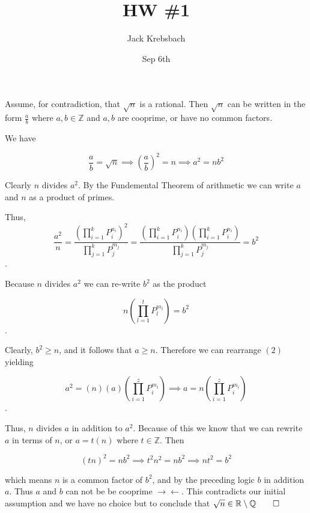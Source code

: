 \documentclass{report}
\title{HW \#1}
\author{Jack Krebsbach }
\date{Sep 6th}
\begin{document}
\maketitle

\sol Assume, for contradiction, that $\sqrt{n}$ is a rational. Then $\sqrt{n}$ can be written in the form $\frac{a}{b}$ where $a,b \in \mathbb{Z}$ and $a,b$ are cooprime, or have no common factors. 

We have 


\begin{equation}
  \frac{a}{b} = \sqrt{n} \implies
  \left(\frac{a}{b}\right)^{2} = n \implies a^2 = n b^2
\end{equation}


Clearly $n$ divides $a^{2}$. 
By the Fundemental Theorem of arithmetic we can write $a$ and $n$ as a product of primes.

Thus, 
\begin{equation}
  \frac{a^2}{n} = \frac{\left(\prod^{k}_{i = 1} P_{i}^{n_i}\right)^2}{\prod_{j = 1}^{k} P_{j}^{m_j}} =\frac{
\left(\prod^{k}_{i = 1} P_{i}^{n_i}\right)
\left(\prod^{k}_{i = 1} P_{i}^{n_i}\right)
  }{\prod_{j = 1}^{k} P_{j}^{m_j}}  = b^2
\end{equation}.


Because $n$ divides $a^2$ we can re-write $b^2$ as the product


\begin{equation}
  n \left(\prod^{t}_{l = 1} P_{l}^{m_l}\right) = b^2
\end{equation}.


Clearly, $b^2 \geq n$, and it follows that $a \geq n$. Therefore we can rearrange $(2)$ yielding

\begin{equation}
  a^2 = (n)(a)\left(\prod^{z}_{i = 1} P_{i}^{m_i}\right)  \implies a = n\left(\prod^{z}_{i = 1} P_{i}^{m_i}\right) 
\end{equation}. 

Thus, $n$ divides $a$ in addition to $a^2$. Because of this we know that we can rewrite $a$ in terms of $n$, or $a = t(n)$ where $t \in \mathbb{Z}$. Then

\begin{equation}
  (tn)^2 = nb^2 \implies t^2n^2 = nb^2 \implies nt^2 = b^2 
\end{equation}

which means $n$ is a common factor of $b^2$, and by the preceding logic $b$ in addition $a$. Thus $a$ and $b$ can not be be cooprime  $\rightarrow\!\leftarrow$. This contradicts our initial assumption and we have no choice but to conclude that $\sqrt{n} \in \mathbb{R} \setminus \mathbb{Q} \qed$
\end{document}
